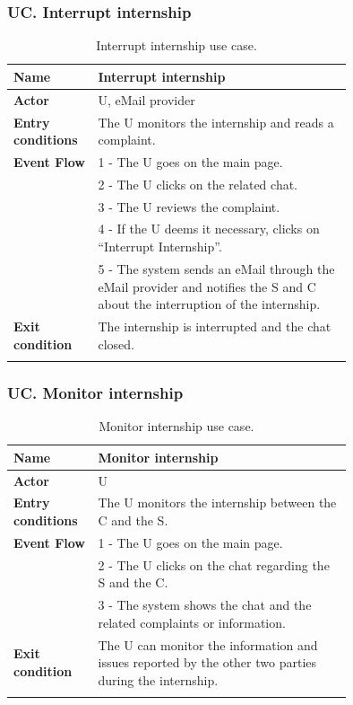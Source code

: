 \subsubsection*{UC\cuc . Interrupt internship}
\begin{center}
    \begin{longtable}{|l|p{0.75\linewidth}|}
        \hline
        \textbf{Name}               & Interrupt internship\\
        \hline
        \textbf{Actor}              & U, eMail provider\\
        \hline
        \textbf{Entry conditions}   & The U monitors the internship and reads a complaint.\\
        \hline
        \textbf{Event Flow}         & 1 - The U goes on the main page. \\
        & 2 - The U clicks on the related chat. \\
        & 3 - The U reviews the complaint. \\
        & 4 - If the U deems it necessary, clicks on “Interrupt Internship”. \\
        & 5 - The system sends an eMail through the eMail provider and notifies the S and C about the interruption of the internship. \\
        \hline
        \textbf{Exit condition}   & The internship is interrupted and the chat closed. \\       
        \hline
        \caption{Interrupt internship use case.}
        \label{tab: interrupt_internship_use_case}
    \end{longtable}
\end{center}


\subsubsection*{UC\cuc . Monitor internship}
\begin{center}
    \begin{longtable}{|l|p{0.75\linewidth}|}
        \hline
        \textbf{Name}               & Monitor internship\\
        \hline
        \textbf{Actor}              & U\\
        \hline
        \textbf{Entry conditions}   & The U monitors the internship between the C and the S.\\
        \hline
        \textbf{Event Flow}         & 1 - The U goes on the main page. \\
        & 2 - The U clicks on the chat regarding the S and the C. \\
        & 3 - The system shows the chat and the related complaints or information. \\
        \hline
        \textbf{Exit condition}   & The U can monitor the information and issues reported by the other two parties during the internship. \\       
        \hline
        \caption{Monitor internship use case.}
        \label{tab: monitor_internship_use_case}
    \end{longtable}
\end{center}


